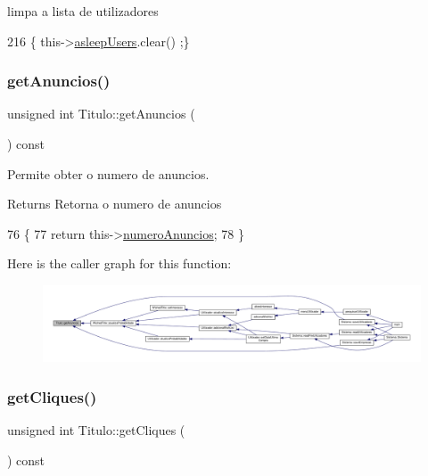 limpa a lista de utilizadores 


\begin{DoxyCode}
216 \{ this->\hyperlink{classTitulo_a84e7b9dc58fbba5f048a57a0878a43e8}{asleepUsers}.clear() ;\}
\end{DoxyCode}
\mbox{\label{classTitulo_ad36afe75694812eabe74af5fe32ad95b}} 
\subsubsection{\texorpdfstring{get\+Anuncios()}{getAnuncios()}}
{\footnotesize\ttfamily unsigned int Titulo\+::get\+Anuncios (\begin{DoxyParamCaption}{ }\end{DoxyParamCaption}) const}



Permite obter o numero de anuncios. 

\begin{DoxyReturn}{Returns}
Retorna o numero de anuncios 
\end{DoxyReturn}

\begin{DoxyCode}
76                                         \{
77      \textcolor{keywordflow}{return} this->\hyperlink{classTitulo_a31919af9268f0c6e55b786457d1df586}{numeroAnuncios};
78  \}
\end{DoxyCode}
Here is the caller graph for this function\+:
\nopagebreak
\begin{figure}[H]
\begin{center}
\leavevmode
\includegraphics[width=350pt]{classTitulo_ad36afe75694812eabe74af5fe32ad95b_icgraph}
\end{center}
\end{figure}
\mbox{\label{classTitulo_a71d5b5985170de5612ec49c5c955f120}} 
\subsubsection{\texorpdfstring{get\+Cliques()}{getCliques()}}
{\footnotesize\ttfamily unsigned int Titulo\+::get\+Cliques (\begin{DoxyParamCaption}{ }\end{DoxyParamCaption}) const}



